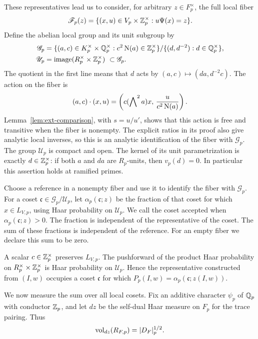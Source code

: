 These representatives lead us to consider, for arbitrary \(z\in F_p^\times\),
the full local fiber
\[
 \mathscr F_p(z)=
 \{(x,u)\in V_p\times\mathbb Z_p^\times:u\Psi(x)=z\}.
\]
Define the abelian local group and its unit subgroup by
\begin{align}
 \mathscr G_p
  &=\{(a,c)\in K_p^\times\times\mathbb Q_p^\times:
                 c^2\operatorname{N}(a)\in\mathbb Z_p^\times\}/
        \{(d,d^{-2}):d\in\mathbb Q_p^\times\}, \notag\\
 \mathscr U_p
  &=\operatorname{image}(R_p^\times\times\mathbb Z_p^\times)
       \ \subset\mathscr G_p.
 \label{eq:ext-local-group}
\end{align}
The quotient in the first line means that \(d\) acts by
\((a,c)\mapsto(da,d^{-2}c)\).  The action on the fiber is
\begin{equation}
 (a,c)\cdot(x,u)=
 \left(c(\bigwedge\nolimits^2a)x,\,
                    \frac{u}{c^2\operatorname{N}(a)}\right).
 \label{eq:ext-fiber-action}
\end{equation}
Lemma~\ref{lem:ext-comparison}, with \(s=u/u'\), shows that this action
is free and transitive when the fiber is nonempty.  The explicit ratios
in its proof also give analytic local inverses, so this is an analytic
identification of the fiber with \(\mathscr G_p\).  The group
\(\mathscr U_p\) is compact and open.  The kernel of its unit
parametrization is exactly \(d\in\mathbb Z_p^\times\): if both \(a\) and \(da\)
are \(R_p\)-units, then \(v_p(d)=0\).  In particular this assertion
holds at ramified primes.

Choose a reference in a nonempty fiber and use it to identify the fiber
with \(\mathscr G_p\).  For a coset
\(\mathfrak c\in\mathscr G_p/\mathscr U_p\), let
\(\alpha_p(\mathfrak c;z)\) be the fraction of that coset for which
\(x\in L_{V,p}\), using Haar probability on \(\mathscr U_p\).
We call the coset accepted when \(\alpha_p(\mathfrak c;z)>0\).
The fraction is independent of the representative of the coset.  The sum of
these fractions is independent of the reference.  For an empty fiber
we declare this sum to be zero.

A scalar \(c\in\mathbb Z_p^\times\) preserves \(L_{V,p}\).  The pushforward of
the product Haar probability on \(R_p^\times\times\mathbb Z_p^\times\) is
Haar probability on \(\mathscr U_p\).  Hence the representative constructed
from \((I,w)\) occupies a coset \(\mathfrak c\) for which
\(P_p(I,w)=\alpha_p(\mathfrak c;z(I,w))\).

We now measure the sum over all local cosets.  Fix an additive character
\(\psi_p\) of \(\mathbb Q_p\) with conductor \(\mathbb Z_p\), and let \(dz\) be the
self-dual Haar measure on \(F_p\) for the trace pairing.  Thus
\begin{equation}
 \operatorname{vol}_{dz}(R_{F,p})=|D_F|_p^{1/2}.
 \label{eq:ext-self-dual-measure}
\end{equation}

